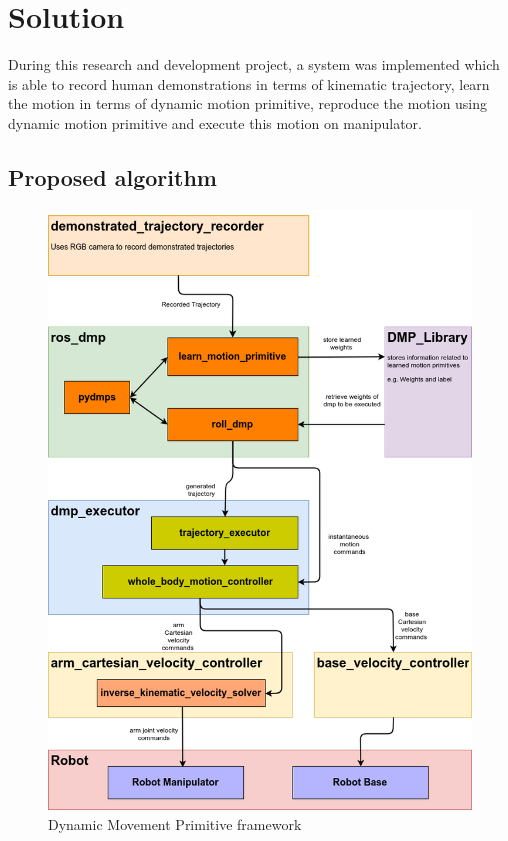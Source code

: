 
\chapter{Solution}

During this research and development project, a system was implemented which is able to record human demonstrations in terms of kinematic trajectory, learn the motion in terms of dynamic motion primitive, reproduce the motion using dynamic motion primitive and execute this motion on manipulator.     

\section{Proposed algorithm}

\newpage
\begin{figure}[H]
	\includegraphics[width=\textwidth]{images/framework.png}
	\caption{Dynamic Movement Primitive framework}
	\label{fig:framework}
\end{figure}

